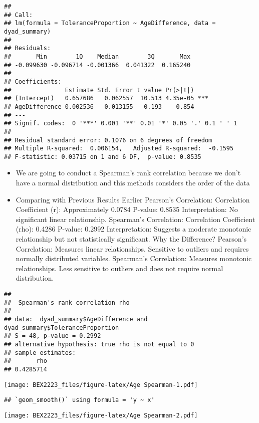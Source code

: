 \documentclass[
]{article}
\begin{document}
\begin{verbatim}
## 
## Call:
## lm(formula = ToleranceProportion ~ AgeDifference, data = dyad_summary)
## 
## Residuals:
##       Min        1Q    Median        3Q       Max 
## -0.099630 -0.096714 -0.001366  0.041322  0.165240 
## 
## Coefficients:
##               Estimate Std. Error t value Pr(>|t|)    
## (Intercept)   0.657686   0.062557  10.513 4.35e-05 ***
## AgeDifference 0.002536   0.013155   0.193    0.854    
## ---
## Signif. codes:  0 '***' 0.001 '**' 0.01 '*' 0.05 '.' 0.1 ' ' 1
## 
## Residual standard error: 0.1076 on 6 degrees of freedom
## Multiple R-squared:  0.006154,   Adjusted R-squared:  -0.1595 
## F-statistic: 0.03715 on 1 and 6 DF,  p-value: 0.8535
\end{verbatim}

\begin{itemize}
\item
  We are going to conduct a Spearman's rank correlation because we don't
  have a normal distribution and this methods considers the order of the
  data
\item
  Comparing with Previous Results Earlier Pearson's Correlation:
  Correlation Coefficient (r): Approximately 0.0784 P-value: 0.8535
  Interpretation: No significant linear relationship. Spearman's
  Correlation: Correlation Coefficient (rho): 0.4286 P-value: 0.2992
  Interpretation: Suggests a moderate monotonic relationship but not
  statistically significant. Why the Difference? Pearson's Correlation:
  Measures linear relationships. Sensitive to outliers and requires
  normally distributed variables. Spearman's Correlation: Measures
  monotonic relationships. Less sensitive to outliers and does not
  require normal distribution.
\end{itemize}

\begin{verbatim}
## 
##  Spearman's rank correlation rho
## 
## data:  dyad_summary$AgeDifference and dyad_summary$ToleranceProportion
## S = 48, p-value = 0.2992
## alternative hypothesis: true rho is not equal to 0
## sample estimates:
##       rho 
## 0.4285714
\end{verbatim}

\texttt{[image: BEX2223\_files/figure-latex/Age Spearman-1.pdf]}

\begin{verbatim}
## `geom_smooth()` using formula = 'y ~ x'
\end{verbatim}

\texttt{[image: BEX2223\_files/figure-latex/Age Spearman-2.pdf]}
\end{document}

